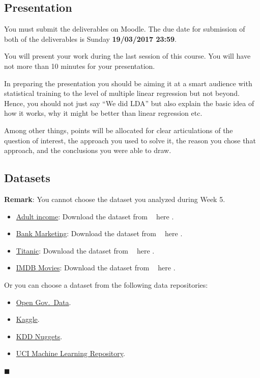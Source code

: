 \documentclass[]{book}
\providecommand{\tightlist}{%
  \setlength{\itemsep}{0pt}\setlength{\parskip}{0pt}}
\begin{document}
\subsection*{Presentation}\label{presentation}

You must submit the deliverables on Moodle. The due date for submission
of both of the deliverables is Sunday \textbf{19/03/2017 23:59}.

You will present your work during the last session of this course. You
will have not more than 10 minutes for your presentation.

In preparing the presentation you should be aiming it at a smart
audience with statistical training to the level of multiple linear
regression but not beyond. Hence, you should not just say ``We did LDA''
but also explain the basic idea of how it works, why it might be better
than linear regression etc.

Among other things, points will be allocated for clear articulations of
the question of interest, the approach you used to solve it, the reason
you chose that approach, and the conclusions you were able to draw.

\subsection*{Datasets}\label{datasets}

\textbf{Remark}: You cannot choose the dataset you analyzed during Week
5.

\begin{itemize}
\tightlist
\item
  \href{https://archive.ics.uci.edu/ml/datasets/Adult}{Adult income}:
  Download the dataset from
  \textcolor{white}{[}\faTable\textcolor{white}{]} here .
\item
  \href{https://archive.ics.uci.edu/ml/datasets/Bank+Marketing}{Bank
  Marketing}: Download the dataset from
  \textcolor{white}{[}\faTable\textcolor{white}{]} here .
\item
  \href{https://www.kaggle.com/c/titanic}{Titanic}: Download the dataset
  from \textcolor{white}{[}\faTable\textcolor{white}{]} here .
\item
  \href{https://www.kaggle.com/deepmatrix/imdb-5000-movie-dataset}{IMDB
  Movies}: Download the dataset from
  \textcolor{white}{[}\faTable\textcolor{white}{]} here .
\end{itemize}

Or you can choose a dataset from the following data repositories:

\begin{itemize}
\tightlist
\item
  \href{www.data.gov.fr}{Open Gov.~Data}.
\item
  \href{www.kaggle.com}{Kaggle}.
\item
  \href{http://www.kdnuggets.com/datasets/}{KDD Nuggets}.
\item
  \href{http://archive.ics.uci.edu/ml/}{UCI Machine Learning
  Repository}.
\end{itemize}

◼
\end{document}
